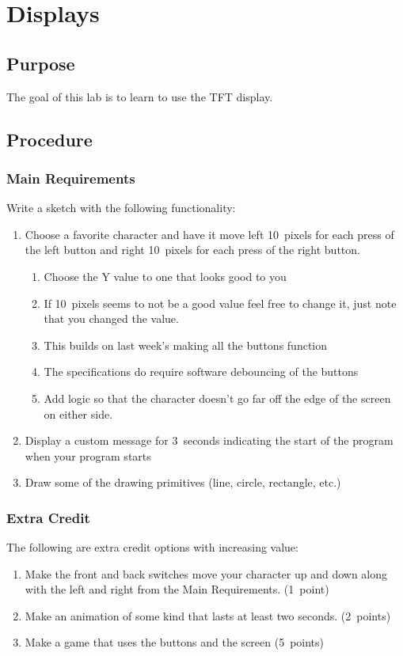 \chapter{Displays}

\section{Purpose}
The goal of this lab is to learn to use the TFT display.

\section{Procedure}
\subsection{Main Requirements}
Write a sketch with the following functionality:
\begin{enumerate}
    \item Choose a favorite character and have it move left 10~pixels for each press
            of the left button and right 10~pixels for each press of the right button.
    \begin{enumerate}
        \item Choose the Y value to one that looks good to you
        \item If 10~pixels seems to not be a good value feel free to change it, just note
                that you changed the value.
        \item This builds on last week's making all the buttons function
        \item The specifications do require software debouncing of the buttons
        \item Add logic so that the character doesn't go far off the edge of the screen
                on either side.
    \end{enumerate}
    \item Display a custom message for 3~seconds indicating the start of the program when
            your program starts 
    \item Draw some of the drawing primitives (line, circle, rectangle, etc.)
\end{enumerate}

\subsection{Extra Credit}
The following are extra credit options with increasing value:
\begin{enumerate}
    \item Make the front and back switches move your character up and down along 
            with the left and right from the Main Requirements. (1~point)
    \item Make an animation of some kind that lasts at least two seconds. (2~points)
    \item Make a game that uses the buttons and the screen (5~points)
\end{enumerate}

